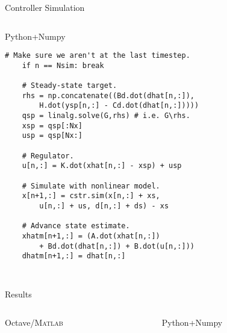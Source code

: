 \documentclass[xcolor=dvipsnames]{beamer}
\begin{document}
\begin{frame}[fragile]{Controller Simulation}
\begin{columns}[T]
\begin{column}[T]{0.45\textwidth}
\begin{block}{Python+Numpy \vphantom{/}}
\begin{lstlisting}[style=python,basicstyle=\ttfamily\fontsize{5pt}{6}\selectfont]
    # Make sure we aren't at the last timestep.
    if n == Nsim: break

    # Steady-state target.
    rhs = np.concatenate((Bd.dot(dhat[n,:]),
        H.dot(ysp[n,:] - Cd.dot(dhat[n,:]))))
    qsp = linalg.solve(G,rhs) # i.e. G\rhs.
    xsp = qsp[:Nx]
    usp = qsp[Nx:]
    
    # Regulator.
    u[n,:] = K.dot(xhat[n,:] - xsp) + usp
    
    # Simulate with nonlinear model.
    x[n+1,:] = cstr.sim(x[n,:] + xs,
        u[n,:] + us, d[n,:] + ds) - xs
    
    # Advance state estimate.
    xhatm[n+1,:] = (A.dot(xhat[n,:])
        + Bd.dot(dhat[n,:]) + B.dot(u[n,:]))
    dhatm[n+1,:] = dhat[n,:]
                       
\end{lstlisting}
\vspace{-.5em}
\end{block}
\end{column}

\end{columns}     

\end{frame}

\begin{frame}{Results}

\begin{columns}
    \begin{column}{.475\textwidth}
        \begin{block}{Octave/\textsc{Matlab}}
            
        \end{block}
    \end{column}
    
    \begin{column}{.475\textwidth}
        \begin{block}{Python+Numpy \vphantom{/}}
            
        \end{block}
    \end{column}
\end{columns}

\end{frame}
\end{document}
